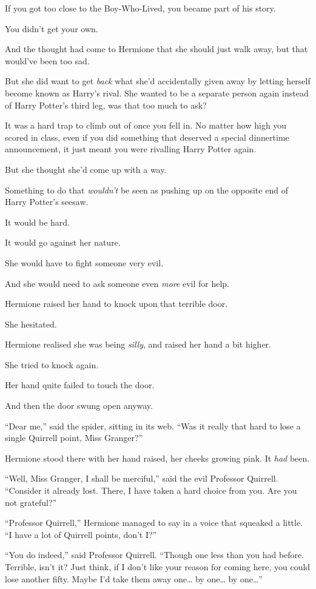 If you got too close to the Boy-Who-Lived, you became part of his story.

You didn't get your own.

And the thought had come to Hermione that she should just walk away, but
that would've been too sad.

But she did want to get \emph{back} what she'd accidentally given away
by letting herself become known as Harry's rival. She wanted to be a
separate person again instead of Harry Potter's third leg, was that too
much to ask?

It was a hard trap to climb out of once you fell in. No matter how high
you scored in class, even if you did something that deserved a special
dinnertime announcement, it just meant you were rivalling Harry Potter
again.

But she thought she'd come up with a way.

Something to do that \emph{wouldn't} be seen as pushing up on the
opposite end of Harry Potter's seesaw.

It would be hard.

It would go against her nature.

She would have to fight someone very evil.

And she would need to ask someone even \emph{more} evil for help.

Hermione raised her hand to knock upon that terrible door.

She hesitated.

Hermione realised she was being \emph{silly}, and raised her hand a bit
higher.

She tried to knock again.

Her hand quite failed to touch the door.

And then the door swung open anyway.

``Dear me,'' said the spider, sitting in its web. ``Was it really that
hard to lose a single Quirrell point, Miss Granger?''

Hermione stood there with her hand raised, her cheeks growing pink. It
\emph{had} been.

``Well, Miss Granger, I shall be merciful,'' said the evil Professor
Quirrell. ``Consider it already lost. There, I have taken a hard choice
from you. Are you not grateful?''

``Professor Quirrell,'' Hermione managed to say in a voice that squeaked
a little. ``I have a lot of Quirrell points, don't I?''

``You do indeed,'' said Professor Quirrell. ``Though one less than you
had before. Terrible, isn't it? Just think, if I don't like your reason
for coming here, you could lose another fifty. Maybe I'd take them away
one\ldots{} by one\ldots{} by one\ldots{}''

